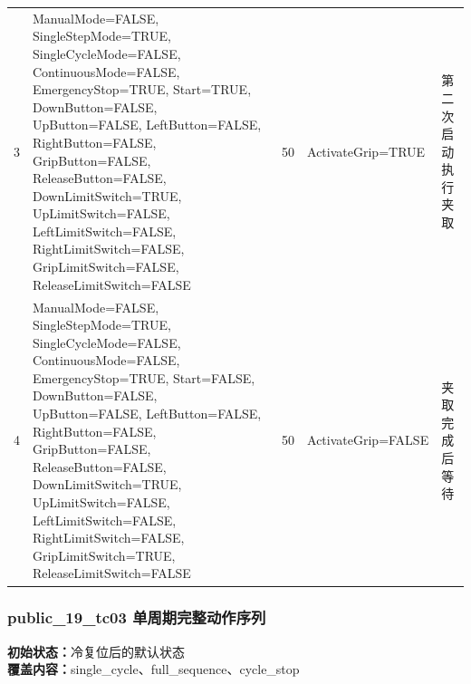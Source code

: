 \begin{longtable}{L{1.0cm}L{4.7cm}L{1.4cm}L{4.0cm}L{2.1cm}}
3 & ManualMode=FALSE, SingleStepMode=TRUE, SingleCycleMode=FALSE, ContinuousMode=FALSE, EmergencyStop=TRUE, Start=TRUE, DownButton=FALSE, UpButton=FALSE, LeftButton=FALSE, RightButton=FALSE, GripButton=FALSE, ReleaseButton=FALSE, DownLimitSwitch=TRUE, UpLimitSwitch=FALSE, LeftLimitSwitch=FALSE, RightLimitSwitch=FALSE, GripLimitSwitch=FALSE, ReleaseLimitSwitch=FALSE & 50 & ActivateGrip=TRUE & 第二次启动执行夹取\\

4 & ManualMode=FALSE, SingleStepMode=TRUE, SingleCycleMode=FALSE, ContinuousMode=FALSE, EmergencyStop=TRUE, Start=FALSE, DownButton=FALSE, UpButton=FALSE, LeftButton=FALSE, RightButton=FALSE, GripButton=FALSE, ReleaseButton=FALSE, DownLimitSwitch=TRUE, UpLimitSwitch=FALSE, LeftLimitSwitch=FALSE, RightLimitSwitch=FALSE, GripLimitSwitch=TRUE, ReleaseLimitSwitch=FALSE & 50 & ActivateGrip=FALSE & 夹取完成后等待\\

\bottomrule

\end{longtable}

\subsubsection{{\ttfamily public\_19\_tc03} 单周期完整动作序列}

\noindent\textbf{初始状态：}冷复位后的默认状态\\

\textbf{覆盖内容：}single\_cycle、full\_sequence、cycle\_stop

